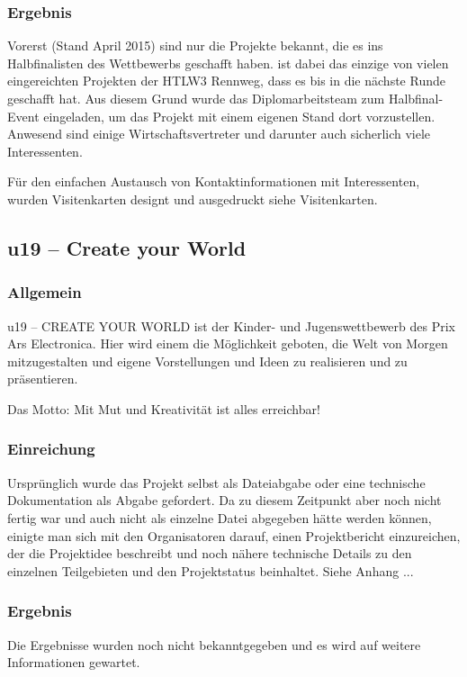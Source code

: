 \subsubsection{Ergebnis}
Vorerst (Stand April 2015) sind nur die Projekte bekannt, die es ins Halbfinalisten des
Wettbewerbs geschafft haben. \sblit ist dabei das einzige von vielen eingereichten Projekten
der HTLW3 Rennweg, dass es bis in die nächste Runde geschafft hat. Aus diesem Grund wurde das Diplomarbeitsteam
zum Halbfinal-Event eingeladen, um das Projekt mit einem eigenen Stand dort vorzustellen.
Anwesend sind einige Wirtschaftsvertreter und darunter auch sicherlich viele
Interessenten.

Für den einfachen Austausch von Kontaktinformationen mit Interessenten, wurden Visitenkarten
designt und ausgedruckt siehe Visitenkarten.


\subsection{u19 -- Create your World}
\subsubsection{Allgemein}
u19 – CREATE YOUR WORLD ist der Kinder- und Jugenswettbewerb des \gls{Prix Ars Electronica}.
Hier wird einem die Möglichkeit geboten, die Welt von Morgen mitzugestalten und eigene Vorstellungen
und Ideen zu realisieren und zu präsentieren.


Das Motto: Mit Mut und Kreativität ist alles erreichbar!

\subsubsection{Einreichung}
Ursprünglich wurde das Projekt selbst als Dateiabgabe oder eine technische Dokumentation als Abgabe gefordert. Da \sblit zu diesem Zeitpunkt
aber noch nicht fertig war und auch nicht als einzelne Datei abgegeben hätte werden können,
einigte man sich mit den Organisatoren darauf, einen Projektbericht einzureichen, der die Projektidee
beschreibt und noch nähere technische Details zu den einzelnen Teilgebieten und den Projektstatus beinhaltet.
Siehe Anhang ...

\subsubsection{Ergebnis}
Die Ergebnisse wurden noch nicht bekanntgegeben und es wird auf weitere Informationen gewartet.

